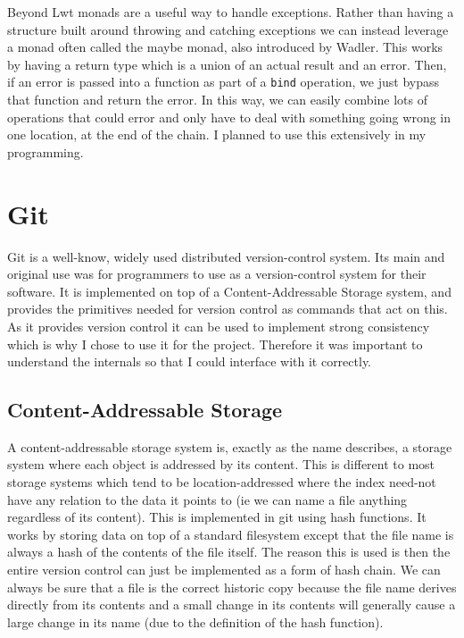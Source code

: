 Beyond Lwt monads are a useful way to handle exceptions. Rather than having a structure built around throwing and catching exceptions we can instead leverage a monad often called the maybe monad, also introduced by Wadler\cite{wadler90monads}. This works by having a return type which is a union of an actual result and an error. Then, if an error is passed into a function as part of a \texttt{bind} operation, we just bypass that function and return the error. In this way, we can easily combine lots of operations that could error and only have to deal with something going wrong in one location, at the end of the chain. I planned to use this extensively in my programming.

\section{Git}

Git\cite{code_git} is a well-know, widely used distributed version-control system. Its main and original use was for programmers to use as a version-control system for their software\cite{TODO}. It is implemented on top of a Content-Addressable Storage system, and provides the primitives needed for version control as commands that act on this. As it provides version control it can be used to implement strong consistency which is why I chose to use it for the project. Therefore it was important to understand the internals so that I could interface with it correctly.

\subsection{Content-Addressable Storage}

A content-addressable storage system is, exactly as the name describes, a storage system where each object is addressed by its content. This is different to most storage systems which tend to be location-addressed where the index need-not have any relation to the data it points to (ie we can name a file anything regardless of its content). This is implemented in git using hash functions. It works by storing data on top of a standard filesystem except that the file name is always a hash of the contents of the file itself. The reason this is used is then the entire version control can just be implemented as a form of hash chain. We can always be sure that a file is the correct historic copy because the file name derives directly from its contents and a small change in its contents will generally cause a large change in its name (due to the definition of the hash function). 

